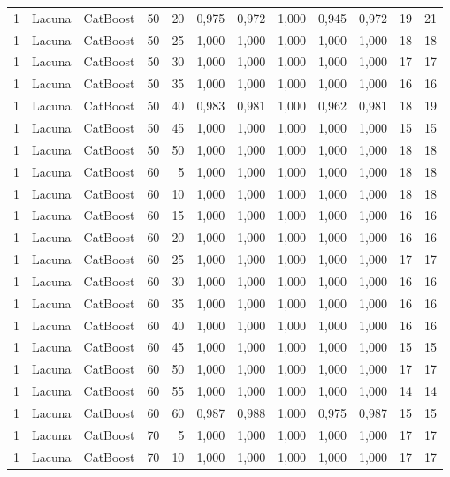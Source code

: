 \begin{longtable}{ccclrrrrrrrr}
1 & Lacuna & CatBoost & 50 & 20 & 0,975 & 0,972 & 1,000 & 0,945 & 0,972 & 19 & 21 \\
1 & Lacuna & CatBoost & 50 & 25 & 1,000 & 1,000 & 1,000 & 1,000 & 1,000 & 18 & 18 \\
1 & Lacuna & CatBoost & 50 & 30 & 1,000 & 1,000 & 1,000 & 1,000 & 1,000 & 17 & 17 \\
1 & Lacuna & CatBoost & 50 & 35 & 1,000 & 1,000 & 1,000 & 1,000 & 1,000 & 16 & 16 \\
1 & Lacuna & CatBoost & 50 & 40 & 0,983 & 0,981 & 1,000 & 0,962 & 0,981 & 18 & 19 \\
1 & Lacuna & CatBoost & 50 & 45 & 1,000 & 1,000 & 1,000 & 1,000 & 1,000 & 15 & 15 \\
1 & Lacuna & CatBoost & 50 & 50 & 1,000 & 1,000 & 1,000 & 1,000 & 1,000 & 18 & 18 \\
1 & Lacuna & CatBoost & 60 & 5 & 1,000 & 1,000 & 1,000 & 1,000 & 1,000 & 18 & 18 \\
1 & Lacuna & CatBoost & 60 & 10 & 1,000 & 1,000 & 1,000 & 1,000 & 1,000 & 18 & 18 \\
1 & Lacuna & CatBoost & 60 & 15 & 1,000 & 1,000 & 1,000 & 1,000 & 1,000 & 16 & 16 \\
1 & Lacuna & CatBoost & 60 & 20 & 1,000 & 1,000 & 1,000 & 1,000 & 1,000 & 16 & 16 \\
1 & Lacuna & CatBoost & 60 & 25 & 1,000 & 1,000 & 1,000 & 1,000 & 1,000 & 17 & 17 \\
1 & Lacuna & CatBoost & 60 & 30 & 1,000 & 1,000 & 1,000 & 1,000 & 1,000 & 16 & 16 \\
1 & Lacuna & CatBoost & 60 & 35 & 1,000 & 1,000 & 1,000 & 1,000 & 1,000 & 16 & 16 \\
1 & Lacuna & CatBoost & 60 & 40 & 1,000 & 1,000 & 1,000 & 1,000 & 1,000 & 16 & 16 \\
1 & Lacuna & CatBoost & 60 & 45 & 1,000 & 1,000 & 1,000 & 1,000 & 1,000 & 15 & 15 \\
1 & Lacuna & CatBoost & 60 & 50 & 1,000 & 1,000 & 1,000 & 1,000 & 1,000 & 17 & 17 \\
1 & Lacuna & CatBoost & 60 & 55 & 1,000 & 1,000 & 1,000 & 1,000 & 1,000 & 14 & 14 \\
1 & Lacuna & CatBoost & 60 & 60 & 0,987 & 0,988 & 1,000 & 0,975 & 0,987 & 15 & 15 \\
1 & Lacuna & CatBoost & 70 & 5 & 1,000 & 1,000 & 1,000 & 1,000 & 1,000 & 17 & 17 \\
1 & Lacuna & CatBoost & 70 & 10 & 1,000 & 1,000 & 1,000 & 1,000 & 1,000 & 17 & 17 \\

\end{longtable}

